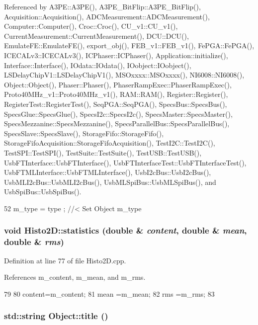 Referenced by A3PE::A3PE(), A3PE\_\-BitFlip::A3PE\_\-BitFlip(), Acquisition::Acquisition(), ADCMeasurement::ADCMeasurement(), Computer::Computer(), Croc::Croc(), CU\_\-v1::CU\_\-v1(), CurrentMeasurement::CurrentMeasurement(), DCU::DCU(), EmulateFE::EmulateFE(), export\_\-obj(), FEB\_\-v1::FEB\_\-v1(), FePGA::FePGA(), ICECALv3::ICECALv3(), ICPhaser::ICPhaser(), Application::initialize(), Interface::Interface(), IOdata::IOdata(), IOobject::IOobject(), LSDelayChipV1::LSDelayChipV1(), MSOxxxx::MSOxxxx(), NI6008::NI6008(), Object::Object(), Phaser::Phaser(), PhaserRampExec::PhaserRampExec(), Proto40MHz\_\-v1::Proto40MHz\_\-v1(), RAM::RAM(), Register::Register(), RegisterTest::RegisterTest(), SeqPGA::SeqPGA(), SpecsBus::SpecsBus(), SpecsGlue::SpecsGlue(), SpecsI2c::SpecsI2c(), SpecsMaster::SpecsMaster(), SpecsMezzanine::SpecsMezzanine(), SpecsParallelBus::SpecsParallelBus(), SpecsSlave::SpecsSlave(), StorageFifo::StorageFifo(), StorageFifoAcquisition::StorageFifoAcquisition(), TestI2C::TestI2C(), TestSPI::TestSPI(), TestSuite::TestSuite(), TestUSB::TestUSB(), UsbFTInterface::UsbFTInterface(), UsbFTInterfaceTest::UsbFTInterfaceTest(), UsbFTMLInterface::UsbFTMLInterface(), UsbI2cBus::UsbI2cBus(), UsbMLI2cBus::UsbMLI2cBus(), UsbMLSpiBus::UsbMLSpiBus(), and UsbSpiBus::UsbSpiBus().


\begin{DoxyCode}
52 { m_type  = type  ; } //< Set Object m_type
\end{DoxyCode}
\hypertarget{classHisto2D_a66875cb46a7e5ff6fa347fe736cbed1b}{
\subsubsection[{statistics}]{\setlength{\rightskip}{0pt plus 5cm}void Histo2D::statistics (double \& {\em content}, \/  double \& {\em mean}, \/  double \& {\em rms})}}
\label{classHisto2D_a66875cb46a7e5ff6fa347fe736cbed1b}


Definition at line 77 of file Histo2D.cpp.

References m\_\-content, m\_\-mean, and m\_\-rms.


\begin{DoxyCode}
79                                      {
80   content=m_content;
81   mean   =m_mean;
82   rms    =m_rms;
83 }
\end{DoxyCode}
\hypertarget{classObject_a73a0f1a41828fdd8303dd662446fb6c3}{
\subsubsection[{title}]{\setlength{\rightskip}{0pt plus 5cm}std::string Object::title ()}}
\label{classObject_a73a0f1a41828fdd8303dd662446fb6c3}


